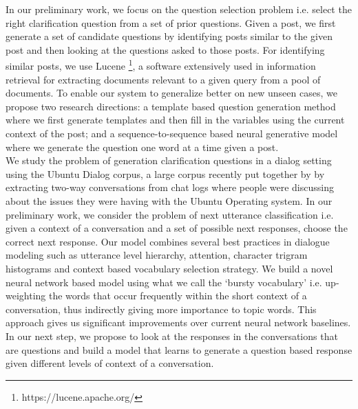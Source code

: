 \documentclass[11pt]{report}
\numberwithin{equation}{section}
\begin{document}
\noindent
In our preliminary work, we focus on the question selection problem i.e. select the right clarification question from a set of prior questions. Given a post, we first generate a set of candidate questions by identifying posts similar to the given post and then looking at the questions asked to those posts. For identifying similar posts, we use Lucene \footnote{https://lucene.apache.org/}, a software extensively used in information retrieval for extracting documents relevant to a given query from a pool of documents. To enable our system to generalize better on new unseen cases, we propose two research directions: a template based question generation method where we first generate templates and then fill in the variables using the current context of the post; and a sequence-to-sequence based neural generative model where we generate the question one word at a time given a post.\\

\noindent
We study the problem of generation clarification questions in a dialog setting using the Ubuntu Dialog corpus, a large corpus recently put together by \cite{} by extracting two-way conversations from chat logs where people were discussing about the issues they were having with the Ubuntu Operating system. In our preliminary work, we consider the problem of next utterance classification i.e. given a context of a conversation and a set of possible next responses, choose the correct next response. %
Our model combines several best practices in dialogue modeling such as utterance level hierarchy, attention, character trigram histograms and context based vocabulary selection strategy. 
We build a novel neural network based model using what we call the `bursty vocabulary' i.e. up-weighting the words that occur frequently within the short context of a conversation, thus indirectly giving more importance to topic words. This approach gives us significant improvements over current neural network baselines. In our next step, we propose to look at the responses in the conversations that are questions and build a model that learns to generate a question based response given different levels of context of a conversation.
\end{document}
